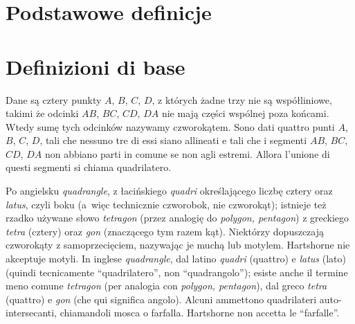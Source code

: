 
%

\section{Podstawowe definicje} %
\section{Definizioni di base} %

\begin{definition}
[czworokąt] %
[quadrilatero] %
Dane są cztery punkty $A$, $B$, $C$, $D$, z których żadne trzy nie są współliniowe, takimi że odcinki $AB$, $BC$, $CD$, $DA$ nie mają części wspólnej poza końcami. %
Wtedy sumę tych odcinków nazywamy czworokątem. %
Sono dati quattro punti $A$, $B$, $C$, $D$, tali che nessuno tre di essi siano allineati e tali che i segmenti $AB$, $BC$, $CD$, $DA$ non abbiano parti in comune se non agli estremi. %
Allora l’unione di questi segmenti si chiama quadrilatero. %
\end{definition}


Po angielsku \emph{quadrangle}, z łacińskiego \emph{quadri} określającego liczbę cztery oraz \emph{latus}, czyli boku (a~więc technicznie czworobok, nie czworokąt); istnieje też rzadko używane słowo \emph{tetragon} (przez analogię do \emph{polygon, pentagon}) z greckiego \emph{tetra} (cztery) oraz \emph{gon} (znaczącego tym razem kąt). %
Niektórzy dopuszczają czworokąty z samoprzecięciem, nazywając je muchą lub motylem. %
Hartshorne \cite[s.~80]{hartshorne_2000} nie akceptuje motyli. %
In inglese \emph{quadrangle}, dal latino \emph{quadri} (quattro) e \emph{latus} (lato) (quindi tecnicamente ``quadrilatero'', non ``quadrangolo''); esiste anche il termine meno comune \emph{tetragon} (per analogia con \emph{polygon, pentagon}), dal greco \emph{tetra} (quattro) e \emph{gon} (che qui significa angolo). %
Alcuni ammettono quadrilateri auto-intersecanti, chiamandoli mosca o farfalla. %
Hartshorne \cite[p.~80]{hartshorne_2000} non accetta le ``farfalle''. %

